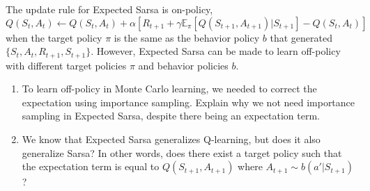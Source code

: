The update rule for Expected Sarsa is on-policy,
$$ Q(S_{t}, A_{t}) \leftarrow Q(S_{t}, A_{t}) + \alpha \left[  R_{t+1} + \gamma \mathbb{E}_{\pi}[Q(S_{t+1}, A_{t+1}) | S_{t+1}] - Q(S_{t}, A_{t})\right]$$
when the target policy $\pi$ is the same as the behavior policy $b$ that generated $\{S_{t}, A_{t}, R_{t+1}, S_{t+1}\}$.
However, Expected Sarsa can be made to learn off-policy with different target policies $\pi$ and behavior policies $b$.
\begin{enumerate}
  \item To learn off-policy in Monte Carlo learning, we needed to correct the expectation using importance sampling.
    Explain why we not need importance sampling in Expected Sarsa, despite there being an expectation term.
  \item We know that Expected Sarsa generalizes Q-learning, but does it also generalize Sarsa?
    In other words, does there exist a target policy such that the expectation term is equal to $Q(S_{t+1}, A_{t+1})$ where $A_{t+1} \sim b(a' | S_{t+1})$?
\end{enumerate}





  
